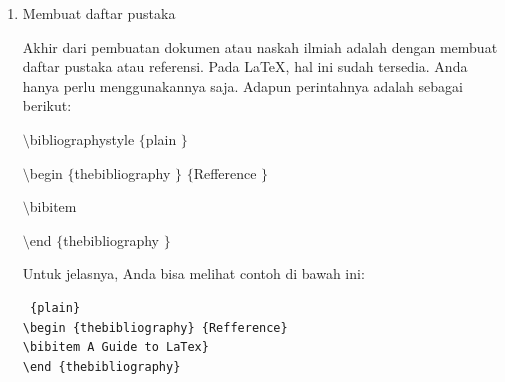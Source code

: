 \begin{enumerate}
\begin{verbatim}
\end{verbatim}
\vspace{8pt}
\item Membuat daftar pustaka \par
Akhir dari pembuatan dokumen atau naskah ilmiah adalah dengan membuat daftar pustaka atau referensi. Pada LaTeX, hal ini sudah tersedia. Anda hanya perlu menggunakannya saja. Adapun perintahnya adalah sebagai berikut: \par
{\fontsize{10pt}{10pt}\selectfont  $  \setminus  $bibliographystyle $  \{  $plain $  \}  $} \par
{\fontsize{10pt}{10pt}\selectfont  $  \setminus  $begin $  \{  $thebibliography $  \}  $ $  \{  $Refference $  \}  $} \par
{\fontsize{10pt}{10pt}\selectfont  $  \setminus  $bibitem} \par
{\fontsize{10pt}{10pt}\selectfont  $  \setminus  $end $  \{  $thebibliography $  \}  $} \par
\vspace{12pt}
Untuk jelasnya, Anda bisa melihat contoh di bawah ini: \par
\begin{verbatim}
 {plain}
\begin {thebibliography} {Refference}
\bibitem A Guide to LaTex}
\end {thebibliography} 
\end{verbatim}
\end{enumerate}
